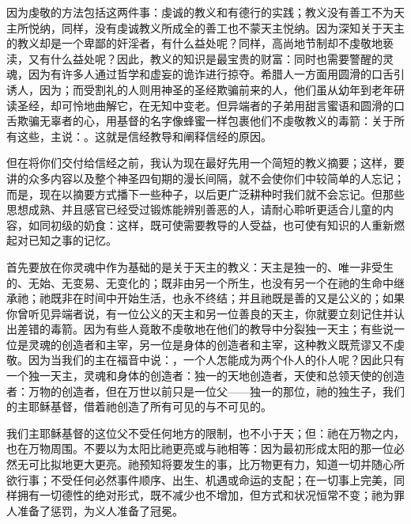 因为虔敬的方法包括这两件事：虔诚的教义和有德行的实践；教义没有善工不为天主所悦纳，同样，没有虔诚教义所成全的善工也不蒙天主悦纳。因为深知关于天主的教义却是一个卑鄙的奸淫者，有什么益处呢？同样，高尚地节制却不虔敬地亵渎，又有什么益处呢？因此，教义的知识是最宝贵的财富：同时也需要警醒的灵魂，因为有许多人通过哲学和虚妄的诡诈进行掠夺。希腊人一方面用圆滑的口舌引诱人，因为；而受割礼的人则用神圣的圣经欺骗前来的人，他们虽从幼年到老年研读圣经，却可怜地曲解它，在无知中变老。但异端者的子弟用甜言蜜语和圆滑的口舌欺骗无辜者的心，用基督的名字像蜂蜜一样包裹他们不虔敬教义的毒箭：关于所有这些，主说：。这就是信经教导和阐释信经的原因。\par

但在将你们交付给信经之前，我认为现在最好先用一个简短的教义摘要；这样，要讲的众多内容以及整个神圣四旬期的漫长间隔，就不会使你们中较简单的人忘记；而是，现在以摘要方式播下一些种子，以后更广泛耕种时我们就不会忘记。但那些思想成熟、并且感官已经受过锻炼能辨别善恶的人，请耐心聆听更适合儿童的内容，如同初级的奶食：这样，既可使需要教导的人受益，也可使有知识的人重新燃起对已知之事的记忆。\par

\par

首先要放在你灵魂中作为基础的是关于天主的教义：天主是独一的、唯一非受生的、无始、无变易、无变化的；既非由另一个所生，也没有另一个在祂的生命中继承祂；祂既非在时间中开始生活，也永不终结；并且祂既是善的又是公义的；如果你曾听见异端者说，有一位公义的天主和另一位善良的天主，你就要立刻记住并认出差错的毒箭。因为有些人竟敢不虔敬地在他们的教导中分裂独一天主；有些说一位是灵魂的创造者和主宰，另一位是身体的创造者和主宰，这种教义既荒谬又不虔敬。因为当我们的主在福音中说：，一个人怎能成为两个仆人的仆人呢？因此只有一个独一天主，灵魂和身体的创造者：独一的天地创造者，天使和总领天使的创造者：万物的创造者，但在万世以前只是一位父——独一的那位，祂的独生子，我们的主耶稣基督，借着祂创造了所有可见的与不可见的。\par

我们主耶稣基督的这位父不受任何地方的限制，也不小于天；但：祂在万物之内，也在万物周围。不要以为太阳比祂更亮或与祂相等：因为最初形成太阳的那一位必然无可比拟地更大更亮。祂预知将要发生的事，比万物更有力，知道一切并随心所欲行事；不受任何必然事件顺序、出生、机遇或命运的支配；在一切事上完美，同样拥有一切德性的绝对形式，既不减少也不增加，但方式和状况恒常不变；祂为罪人准备了惩罚，为义人准备了冠冕。\par

